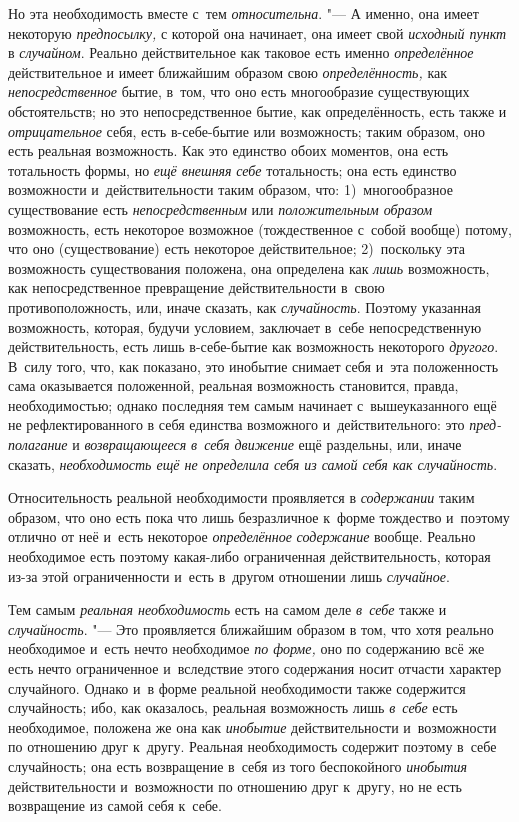 Но эта необходимость вместе с~тем {\em относительна}. "---
А именно, она имеет некоторую {\em предпосылку,} с
которой она начинает, она имеет свой {\em исходный
пункт} в {\em случайном}. Реально действительное как
таковое есть именно {\em определённое} действительное и
имеет ближайшим образом свою {\em определённость,} как
{\em непосредственное} бытие, в~том, что оно есть
многообразие существующих обстоятельств; но это непосредственное бытие, как
определённость, есть также и {\em отрицательное} себя,
есть в-себе-бытие или возможность; таким образом, оно есть реальная
возможность. Как это единство обоих моментов, она есть тотальность формы,
но {\em ещё внешняя} {\em себе}
тотальность; она есть единство возможности и~действительности таким
образом, что: 1)~многообразное существование есть
{\em непосредственным} или
{\em положительным образом} возможность, есть некоторое
возможное (тождественное с~собой вообще) потому, что оно (существование)
есть некоторое действительное; 2)~поскольку эта возможность существования
положена, она определена как {\em лишь} возможность,
как непосредственное превращение действительности в~свою противоположность,
или, иначе сказать, как {\em случайность}. Поэтому
указанная возможность, которая, будучи условием, заключает в~себе
непосредственную действительность, есть лишь в-себе-бытие как возможность
некоторого {\em другого}. В~силу того, что, как
показано, это инобытие снимает себя и~эта положенность сама оказывается
положенной, реальная возможность становится, правда, необходимостью; однако
последняя тем самым начинает с~вышеуказанного ещё не рефлектированного в
себя единства возможного и~действительного: это
{\em пред-полагание} и
{\em возвращающееся} {\em в~себя
движение} ещё раздельны, или, иначе сказать,
{\em необходимость ещё не определила себя из самой себя
как случайность}.

Относительность реальной необходимости проявляется в
{\em содержании} таким образом, что оно есть пока что
лишь безразличное к~форме тождество и~поэтому отлично от неё и~есть
некоторое {\em определённое}
{\em содержание} вообще. Реально необходимое есть
поэтому какая-либо ограниченная действительность, которая из-за этой
ограниченности и~есть в~другом отношении лишь
{\em случайное}.

Тем самым {\em реальная необходимость} есть на самом
деле {\em в~себе} также и
{\em случайность}. "--- Это проявляется ближайшим образом
в том, что хотя реально необходимое и~есть нечто необходимое
{\em по форме,} оно по содержанию всё же есть нечто
ограниченное и~вследствие этого содержания носит отчасти характер
случайного. Однако и~в форме реальной необходимости также содержится
случайность; ибо, как оказалось, реальная возможность лишь
{\em в~себе} есть необходимое, положена же она как
{\em инобытие} действительности и~возможности по
отношению друг к~другу. Реальная необходимость содержит поэтому в~себе
случайность; она есть возвращение в~себя из того беспокойного
{\em инобытия} действительности и~возможности по
отношению друг к~другу, но не есть возвращение из самой себя к~себе.

